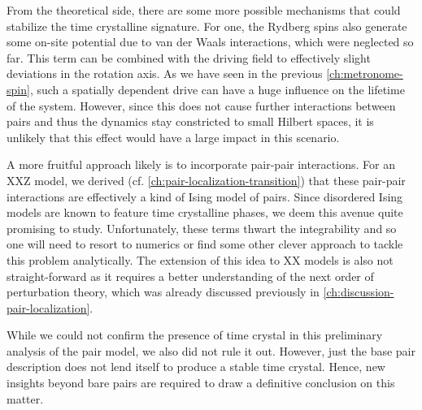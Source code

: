 From the theoretical side, there are some more possible mechanisms that could stabilize the time crystalline signature. For one, the Rydberg spins also generate some on-site potential due to van der Waals interactions, which were neglected so far. This term can be combined with the driving field to effectively slight deviations in the rotation axis. As we have seen in the previous \autoref{ch:metronome-spin}, such a spatially dependent drive can have a huge influence on the lifetime of the system. However, since this does not cause further interactions between pairs and thus the dynamics stay constricted to small Hilbert spaces, it is unlikely that this effect would have a large impact in this scenario.

A more fruitful approach likely is to incorporate pair-pair interactions. For an XXZ model, we derived (cf. \autoref{ch:pair-localization-transition}) that these pair-pair interactions are effectively a kind of Ising model of pairs. Since disordered Ising models are known to feature time crystalline phases, we deem this avenue quite promising to study. Unfortunately, these terms thwart the integrability and so one will need to resort to numerics or find some other clever approach to tackle this problem analytically.
The extension of this idea to XX models is also not straight-forward as it requires a better understanding of the next order of perturbation theory, which was already discussed previously in \autoref{ch:discussion-pair-localization}.

While we could not confirm the presence of time crystal in this preliminary analysis of the pair model, we also did not rule it out. However, just the base pair description does not lend itself to produce a stable time crystal. Hence, new insights beyond bare pairs are required to draw a definitive conclusion on this matter.

